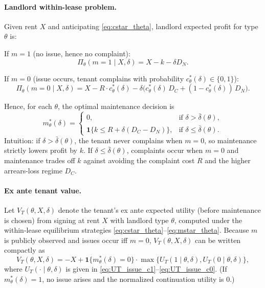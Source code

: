 \documentclass[11pt]{article}
\begin{document}
\paragraph{Landlord within-lease problem.}
Given rent $X$ and anticipating \eqref{eq:cstar_theta}, landlord expected profit for type $\theta$ is:

If $m=1$ (no issue, hence no complaint):
\begin{equation}
\Pi_\theta(m=1\mid X,\delta)= X - k - \delta D_N.
\label{eq:Pi_m1_theta}
\end{equation}

If $m=0$ (issue occurs, tenant complains with probability $c^*_\theta(\delta)\in\{0,1\}$):
\begin{equation}
\Pi_\theta(m=0\mid X,\delta)= X
- R\cdot c^*_\theta(\delta)
- \delta\Big(c^*_\theta(\delta)\,D_C + (1-c^*_\theta(\delta))\,D_N\Big).
\label{eq:Pi_m0_theta}
\end{equation}

Hence, for each $\theta$, the optimal maintenance decision is
\begin{equation}
m^*_\theta(\delta)=
\begin{cases}
0, & \text{if } \delta>\bar\delta(\theta),\\[4pt]
\mathbf{1}\{k \le R + \delta(D_C-D_N)\}, & \text{if } \delta\le \bar\delta(\theta).
\end{cases}
\label{eq:mstar_theta}
\end{equation}
Intuition: if $\delta>\bar\delta(\theta)$, the tenant never complains when $m=0$, so maintenance strictly lowers profit by $k$. If $\delta\le\bar\delta(\theta)$, complaints occur when $m=0$ and maintenance trades off $k$ against avoiding the complaint cost $R$ and the higher arrears-loss regime $D_C$.

\paragraph{Ex ante tenant value.}
Let $V_T(\theta,X,\delta)$ denote the tenant's ex ante expected utility (before maintenance is chosen) from signing at rent $X$ with landlord type $\theta$, computed under the within-lease equilibrium strategies \eqref{eq:cstar_theta}--\eqref{eq:mstar_theta}. Because $m$ is publicly observed and issues occur iff $m=0$, $V_T(\theta,X,\delta)$ can be written compactly as
\begin{equation}
V_T(\theta,X,\delta)= -X + \mathbf{1}\{m^*_\theta(\delta)=0\}\cdot \max\{U_T(1\mid \theta,\delta),U_T(0\mid \theta,\delta)\},
\label{eq:VT_def}
\end{equation}
where $U_T(\cdot\mid \theta,\delta)$ is given in \eqref{eq:UT_issue_c1}--\eqref{eq:UT_issue_c0}. (If $m^*_\theta(\delta)=1$, no issue arises and the normalized continuation utility is $0$.)
\end{document}
